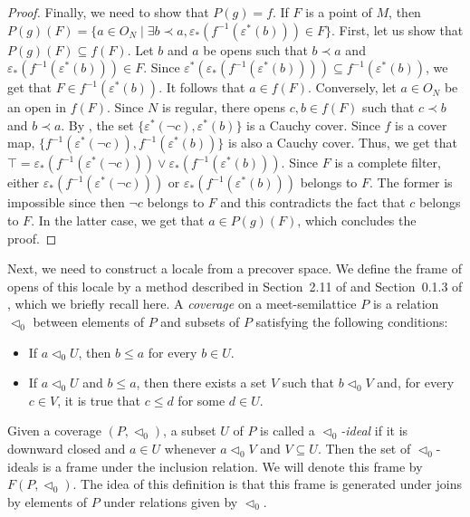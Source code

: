 \documentclass[reqno]{amsart}
\theoremstyle{definition}
\theoremstyle{remark}
\numberwithin{figure}{section}
\newcommand{\rb}{\prec}
\begin{document}
\begin{proof}
Finally, we need to show that $P(g) = f$.
If $F$ is a point of $M$, then $P(g)(F) = \{ a \in O_N \mid \exists b \rb a, \varepsilon_*(f^{-1}(\varepsilon^*(b))) \in F \}$.
First, let us show that $P(g)(F) \subseteq f(F)$.
Let $b$ and $a$ be opens such that $b \rb a$ and $\varepsilon_*(f^{-1}(\varepsilon^*(b))) \in F$.
Since $\varepsilon^*(\varepsilon_*(f^{-1}(\varepsilon^*(b)))) \subseteq f^{-1}(\varepsilon^*(b))$, we get that $F \in f^{-1}(\varepsilon^*(b))$.
It follows that $a \in f(F)$.
Conversely, let $a \in O_N$ be an open in $f(F)$.
Since $N$ is regular, there opens $c,b \in f(F)$ such that $c \rb b$ and $b \rb a$.
By , the set $\{ \varepsilon^*(\neg c), \varepsilon^*(b) \}$ is a Cauchy cover.
Since $f$ is a cover map, $\{ f^{-1}(\varepsilon^*(\neg c)), f^{-1}(\varepsilon^*(b)) \}$ is also a Cauchy cover.
Thus, we get that $\top = \varepsilon_*(f^{-1}(\varepsilon^*(\neg c))) \vee \varepsilon_*(f^{-1}(\varepsilon^*(b)))$.
Since $F$ is a complete filter, either $\varepsilon_*(f^{-1}(\varepsilon^*(\neg c)))$ or $\varepsilon_*(f^{-1}(\varepsilon^*(b)))$ belongs to $F$.
The former is impossible since then $\neg c$ belongs to $F$ and this contradicts the fact that $c$ belongs to $F$.
In the latter case, we get that $a \in P(g)(F)$, which concludes the proof.
\end{proof}

Next, we need to construct a locale from a precover space.
We define the frame of opens of this locale by a method described in Section~2.11 of \cite{stone-spaces} and Section~0.1.3 of \cite{locales-tychonoff}, which we briefly recall here.
A \emph{coverage} on a meet-semilattice $P$ is a relation $\triangleleft_0$ between elements of $P$ and subsets of $P$ satisfying the following conditions:
\begin{itemize}
\item If $a \triangleleft_0 U$, then $b \leq a$ for every $b \in U$.
\item If $a \triangleleft_0 U$ and $b \leq a$, then there exists a set $V$ such that $b \triangleleft_0 V$ and, for every $c \in V$, it is true that $c \leq d$ for some $d \in U$.
\end{itemize}
Given a coverage $(P,\triangleleft_0)$, a subset $U$ of $P$ is called a \emph{$\triangleleft_0$-ideal} if it is downward closed and $a \in U$ whenever $a \triangleleft_0 V$ and $V \subseteq U$.
Then the set of $\triangleleft_0$-ideals is a frame under the inclusion relation.
We will denote this frame by $F(P,\triangleleft_0)$.
The idea of this definition is that this frame is generated under joins by elements of $P$ under relations given by $\triangleleft_0$.
\end{document}
